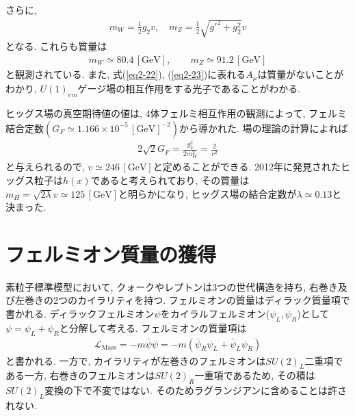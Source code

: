 さらに,
\begin{align}
  m_W = \frac{1}{2}g_2v,\quad m_Z = \frac{1}{2}\sqrt{g'^2+g_2^2}v\nonumber
\end{align}
となる.
これらも質量は
\begin{align}
  m_W \simeq 80.4\,\mathrm{[GeV]},\qquad m_Z \simeq 91.2\,\mathrm{[GeV]} \nonumber
\end{align}
と観測されている.
また, 式(\ref{eq2-22}), (\ref{eq2-23})に表れる$A_\mu$は質量がないことがわかり, $U(1)_{em}$ゲージ場の相互作用をする光子であることがわかる.

ヒッグス場の真空期待値の値は, 4体フェルミ相互作用の観測によって, フェルミ結合定数$(G_F\simeq 1.166\times 10^{-5}\,\mathrm{[GeV]}^{-2})$から導かれた.
場の理論の計算によれば
\begin{align}
  2\sqrt{2}G_F = \frac{g_2^2}{2m_W^2} = \frac{2}{v^2}\nonumber
\end{align}
と与えられるので, $v \simeq 246\,\mathrm{[GeV]}$と定めることができる.
2012年に発見されたヒッグス粒子は$h(x)$であると考えられており, その質量は$m_H = \sqrt{2\lambda}v \simeq 125\,\mathrm{[GeV]}$と明らかになり, ヒッグス場の結合定数が$\lambda \simeq 0.13$と決まった.
\section{フェルミオン質量の獲得}
素粒子標準模型において, クォークやレプトンは3つの世代構造を持ち, 右巻き及び左巻きの2つのカイラリティを持つ.
フェルミオンの質量はディラック質量項で書かれる.
ディラックフェルミオン$\psi$をカイラルフェルミオン($\psi_L, \psi_R$)として$\psi=\psi_L + \psi_R$と分解して考える.
フェルミオンの質量項は
\begin{align}
  \mathcal{L}_{\mathrm{Mass}} = -m\bar{\psi}\psi = -m(\bar{\psi}_R\psi_L + \bar{\psi}_L\psi_R)\nonumber
\end{align}
と書かれる.
一方で, カイラリティが左巻きのフェルミオンは$SU(2)_L$二重項である一方, 右巻きのフェルミオンは$SU(2)_R$一重項であるため, その積は$SU(2)_L$変換の下で不変ではない.
そのためラグランジアンに含めることは許されない.

